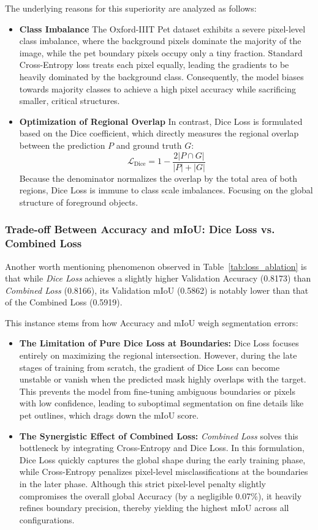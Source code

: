 The underlying reasons for this superiority are analyzed as follows:
\begin{itemize}
    \item \textbf{Class Imbalance} The Oxford-IIIT Pet dataset exhibits a severe pixel-level class imbalance, where the background pixels dominate the majority of the image, while the pet boundary pixels occupy only a tiny fraction. Standard Cross-Entropy loss treats each pixel equally, leading the gradients to be heavily dominated by the background class. Consequently, the model biases towards majority classes to achieve a high pixel accuracy while sacrificing smaller, critical structures.
    \item \textbf{Optimization of Regional Overlap} In contrast, Dice Loss is formulated based on the Dice coefficient, which directly measures the regional overlap between the prediction $P$ and ground truth $G$:
    \begin{equation}
        \mathcal{L}_{\text{Dice}} = 1 - \frac{2 |P \cap G|}{|P| + |G|}
    \end{equation}
    Because the denominator normalizes the overlap by the total area of both regions, Dice Loss is immune to class scale imbalances. Focusing on the global structure of foreground objects.
\end{itemize}


\subsubsection{Trade-off Between Accuracy and mIoU: Dice Loss vs. Combined Loss}
Another worth mentioning phenomenon observed in Table~\ref{tab:loss_ablation} is that while \textit{Dice Loss} achieves a slightly higher Validation Accuracy (0.8173) than \textit{Combined Loss} (0.8166), its Validation mIoU (0.5862) is notably lower than that of the Combined Loss (0.5919). 

This instance stems from how Accuracy and mIoU weigh segmentation errors:
\begin{itemize}
    \item \textbf{The Limitation of Pure Dice Loss at Boundaries:} Dice Loss focuses entirely on maximizing the regional intersection. However, during the late stages of training from scratch, the gradient of Dice Loss can become unstable or vanish when the predicted mask highly overlaps with the target. This prevents the model from fine-tuning ambiguous boundaries or pixels with low confidence, leading to suboptimal segmentation on fine details like pet outlines, which drags down the mIoU score.
    \item \textbf{The Synergistic Effect of Combined Loss:} \textit{Combined Loss} solves this bottleneck by integrating Cross-Entropy and Dice Loss. In this formulation, Dice Loss quickly captures the global shape during the early training phase, while Cross-Entropy penalizes pixel-level misclassifications at the boundaries in the later phase. Although this strict pixel-level penalty slightly compromises the overall global Accuracy (by a negligible 0.07\%), it heavily refines boundary precision, thereby yielding the highest mIoU across all configurations.
\end{itemize}

